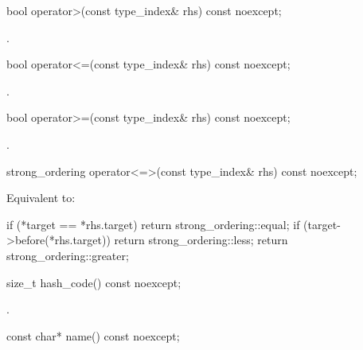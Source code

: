 %
\begin{itemdecl}
bool operator>(const type_index& rhs) const noexcept;
\end{itemdecl}

\begin{itemdescr}
\pnum
\returns
{}.
\end{itemdescr}

%
\begin{itemdecl}
bool operator<=(const type_index& rhs) const noexcept;
\end{itemdecl}

\begin{itemdescr}
\pnum
\returns
{}.
\end{itemdescr}

%
\begin{itemdecl}
bool operator>=(const type_index& rhs) const noexcept;
\end{itemdecl}

\begin{itemdescr}
\pnum
\returns
{}.
\end{itemdescr}

%
\begin{itemdecl}
strong_ordering operator<=>(const type_index& rhs) const noexcept;
\end{itemdecl}

\begin{itemdescr}
\pnum
\effects
Equivalent to:
\begin{codeblock}
if (*target == *rhs.target) return strong_ordering::equal;
if (target->before(*rhs.target)) return strong_ordering::less;
return strong_ordering::greater;
\end{codeblock}
\end{itemdescr}

%
\begin{itemdecl}
size_t hash_code() const noexcept;
\end{itemdecl}

\begin{itemdescr}
\pnum
\returns
{}.
\end{itemdescr}

%
\begin{itemdecl}
const char* name() const noexcept;
\end{itemdecl}

